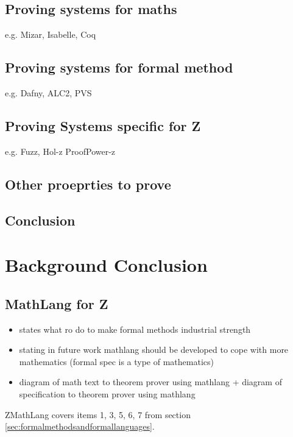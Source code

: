 \subsection{Proving systems for maths}

e.g. Mizar, Isabelle, Coq

\subsection{Proving systems for formal method}

e.g. Dafny, ALC2, PVS

\subsection{Proving Systems specific for Z}
\label{subsec:provingSystemsForZ}

e.g. Fuzz, Hol-z ProofPower-z

\subsection{Other proeprties to prove}
\label{subsec:propertiestoprove}

\subsection{Conclusion}

\section{Background Conclusion}

\subsection{MathLang for Z}

\begin{itemize}
\item \cite{fmpresetation} states what ro do to make formal methods industrial strength

\item \cite{lamarphd} stating in future work mathlang should be developed to cope with more mathematics (formal spec is a type of mathematics)

\item diagram of math text to theorem prover using mathlang + diagram of specification to theorem prover using mathlang
\end{itemize}

ZMathLang covers items 1, 3, 5, 6, 7 from section \ref{sec:formalmethodsandformallanguages}.